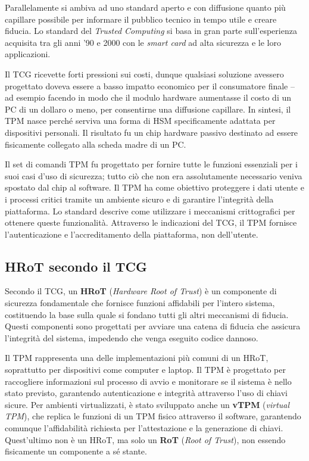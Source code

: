 Parallelamente si ambiva ad uno standard aperto e con diffusione quanto più capillare possibile per informare il pubblico tecnico in tempo utile e creare fiducia. Lo standard del \textit{Trusted Computing} si basa in gran parte sull'esperienza acquisita tra gli anni ’90 e 2000 con le \textit{smart card} ad alta sicurezza e le loro applicazioni.

Il TCG ricevette forti pressioni sui costi, dunque qualsiasi soluzione avessero progettato doveva essere a basso impatto economico per il consumatore finale -- ad esempio facendo in modo che il modulo hardware aumentasse il costo di un PC di un dollaro o meno, per consentirne una diffusione capillare. In sintesi, il TPM nasce perché serviva una forma di HSM specificamente adattata per dispositivi personali. Il risultato fu un chip hardware passivo destinato ad essere fisicamente collegato alla scheda madre di un PC.

Il set di comandi TPM fu progettato per fornire tutte le funzioni essenziali per i suoi casi d'uso di sicurezza; tutto ciò che non era assolutamente necessario veniva spostato dal chip al software. Il TPM ha come obiettivo proteggere i dati utente e i processi critici tramite un ambiente sicuro e di garantire l'integrità della piattaforma. Lo standard descrive come utilizzare i meccanismi crittografici per ottenere queste funzionalità. Attraverso le indicazioni del TCG, il TPM fornisce l'autenticazione e l'accreditamento della piattaforma, non dell'utente.

\clearpage
\subsection{HRoT secondo il TCG}
Secondo il TCG, un \textbf{HRoT} (\textit{Hardware Root of Trust}) è un componente di sicurezza fondamentale che fornisce funzioni affidabili per l’intero sistema, costituendo la base sulla quale si fondano tutti gli altri meccanismi di fiducia. Questi componenti sono progettati per avviare una catena di fiducia che assicura l'integrità del sistema, impedendo che venga eseguito codice dannoso. 

Il TPM rappresenta una delle implementazioni più comuni di un HRoT, soprattutto per dispositivi come computer e laptop. Il TPM è progettato per raccogliere informazioni sul processo di avvio e monitorare se il sistema è nello stato previsto, garantendo autenticazione e integrità attraverso l'uso di chiavi sicure. 
Per ambienti virtualizzati, è stato sviluppato anche un \textbf{vTPM} (\textit{virtual TPM}), che replica le funzioni di un TPM fisico attraverso il software, garantendo comunque l'affidabilità richiesta per l'attestazione e la generazione di chiavi. Quest’ultimo non è un HRoT, ma solo un \textbf{RoT} (\textit{Root of Trust}), non essendo fisicamente un componente a sé stante.


